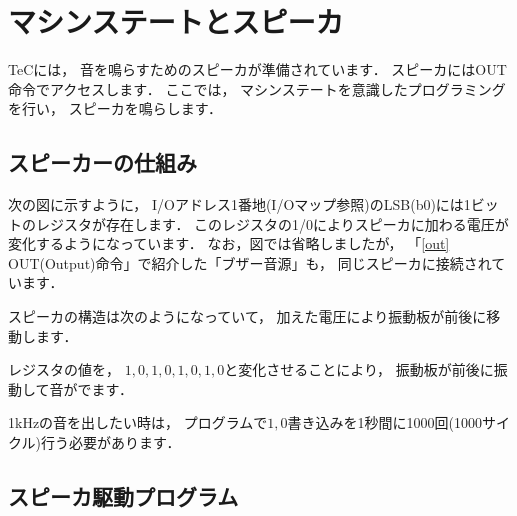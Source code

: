 \newpage
\section{マシンステートとスピーカ}

TeCには，
音を鳴らすためのスピーカが準備されています．
スピーカにはOUT命令でアクセスします．
ここでは，
マシンステートを意識したプログラミングを行い，
スピーカを鳴らします．

\subsection{スピーカーの仕組み}

次の図に示すように，
I/Oアドレス1番地(I/Oマップ参照)のLSB(b0)には1ビットのレジスタが存在します．
このレジスタの1/0によりスピーカに加わる電圧が変化するようになっています．
なお，図では省略しましたが，
「\ref{out} OUT(Output)命令」で紹介した「ブザー音源」も，
同じスピーカに接続されています．



\begin{center}
\epsfxsize=5cm
\end{center}

スピーカの構造は次のようになっていて，
加えた電圧により振動板が前後に移動します．

\begin{center}
\epsfxsize=6cm
\end{center}

レジスタの値を，
$1,0,1,0,1,0,1,0$と変化させることにより，
振動板が前後に振動して音がでます．

1kHzの音を出したい時は，
プログラムで$1,0$書き込みを1秒間に1000回(1000サイクル)行う必要があります．


\newpage
\subsection{スピーカ駆動プログラム}

